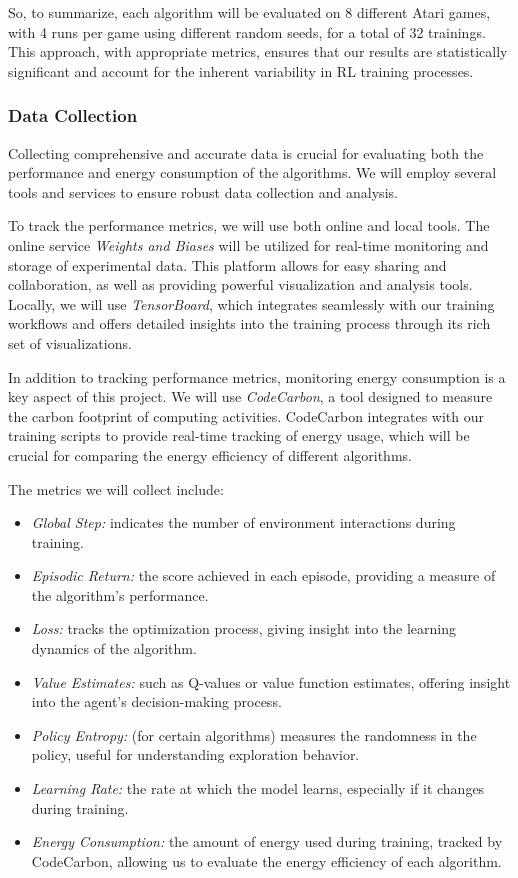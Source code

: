 So, to summarize, each algorithm will be evaluated on 8 different Atari games, with 4 runs per game using different random seeds, for a total of 32 trainings. This approach, with appropriate metrics, ensures that our results are statistically significant and account for the inherent variability in RL training processes.

\subsubsection{Data Collection}
\label{subsubsec:data_collection}

Collecting comprehensive and accurate data is crucial for evaluating both the performance and energy consumption of the algorithms. We will employ several tools and services to ensure robust data collection and analysis.

To track the performance metrics, we will use both online and local tools. The online service \textit{Weights and Biases} will be utilized for real-time monitoring and storage of experimental data. This platform allows for easy sharing and collaboration, as well as providing powerful visualization and analysis tools. Locally, we will use \textit{TensorBoard}, which integrates seamlessly with our training workflows and offers detailed insights into the training process through its rich set of visualizations.

In addition to tracking performance metrics, monitoring energy consumption is a key aspect of this project. We will use \textit{CodeCarbon}, a tool designed to measure the carbon footprint of computing activities. CodeCarbon integrates with our training scripts to provide real-time tracking of energy usage, which will be crucial for comparing the energy efficiency of different algorithms.

The metrics we will collect include:
\begin{itemize}
	\item \textit{Global Step:} indicates the number of environment interactions during training.
	\item \textit{Episodic Return:} the score achieved in each episode, providing a measure of the algorithm's performance.
	\item \textit{Loss:} tracks the optimization process, giving insight into the learning dynamics of the algorithm.
	\item \textit{Value Estimates:} such as Q-values or value function estimates, offering insight into the agent's decision-making process.
	\item \textit{Policy Entropy:} (for certain algorithms) measures the randomness in the policy, useful for understanding exploration behavior.
	\item \textit{Learning Rate:} the rate at which the model learns, especially if it changes during training.
	\item \textit{Energy Consumption:} the amount of energy used during training, tracked by CodeCarbon, allowing us to evaluate the energy efficiency of each algorithm.
\end{itemize}

